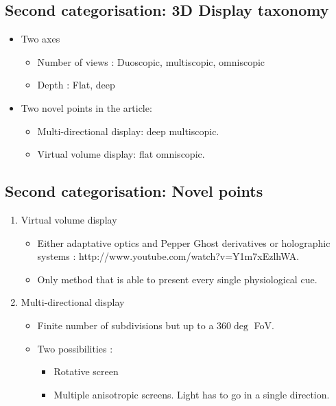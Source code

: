 \subsection{Second categorisation: 3D Display taxonomy}
\begin{frame}
  \begin{itemize}
  \item Two axes
    \begin{itemize}
    \item Number of views : Duoscopic, multiscopic, omniscopic
    \item Depth : Flat, deep
    \end{itemize}
  \item Two novel points in the article: 
    \begin{itemize}
    \item Multi-directional display: deep multiscopic.
    \item Virtual volume display: flat omniscopic.
    \end{itemize}
  \end{itemize}
\end{frame}
\subsection{Second categorisation: Novel points}
\begin{frame}
  \begin{enumerate}
  \item \Large{Virtual volume display}
    \begin{itemize}
    \item Either adaptative optics and Pepper Ghost derivatives or holographic systems : http://www.youtube.com/watch?v=Y1m7xEzlhWA.
    \item Only method that is able to present every single physiological cue.
    \end{itemize}
  \item \Large{Multi-directional display}
    \begin{itemize}
    \item Finite number of subdivisions but up to a $360\deg$ FoV.
    \item Two possibilities : 
      \begin{itemize}
      \item Rotative screen
      \item Multiple anisotropic screens. Light has to go in a single direction.
      \end{itemize}
    \end{itemize}
  \end{enumerate}
\end{frame}
